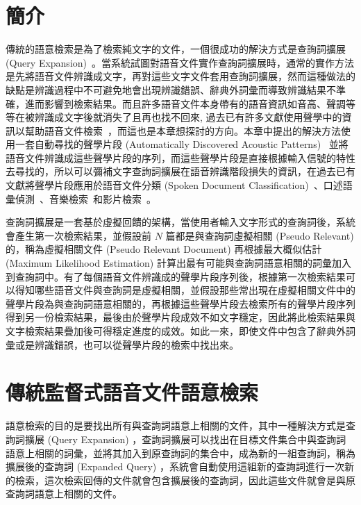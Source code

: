 \section{簡介}
傳統的語意檢索是為了檢索純文字的文件，一個很成功的解決方式是查詢詞擴展 (Query Expansion)~\cite{tao2006regularized, lavrenko2001relevance, lv2009comparative}。當系統試圖對語音文件實作查詢詞擴展時，通常的實作方法是先將語音文件辨識成文字，再對這些文字文件套用查詢詞擴展，然而這種做法的缺點是辨識過程中不可避免地會出現辨識錯誤、辭典外詞彙而導致辨識結果不準確，進而影響到檢索結果。而且許多語音文件本身帶有的語音資訊如音高、聲調等等在被辨識成文字後就消失了且再也找不回來, 過去已有許多文獻使用聲學中的資訊以幫助語音文件檢索~\cite{parada2009query, norouzian2012exploiting, lee2012open, lee2011improved, lee2012integrating}，而這也是本章想探討的方向。本章中提出的解決方法使用一套自動尋找的聲學片段 (Automatically Discovered Acoustic Patterns)~\cite{lee2012nonparametric, jansen2011towards, jansen2010towards, park2008unsupervised, stouten2008discovering, wang2011iterative, vanhainen2012word, driesen2012fast, zhang2010towards} 並將語音文件辨識成這些聲學片段的序列，而這些聲學片段是直接根據輸入信號的特性去尋找的，所以可以彌補文字查詢詞擴展在語音辨識階段損失的資訊，在過去已有文獻將聲學片段應用於語音文件分類 (Spoken Document Classification)~\cite{siu2010improved, hazen2011topic, gish2009unsupervised, chaudhuri2011unsupervised}、口述語彙偵測~\cite{lee2012nonparametric, huijbregts2011unsupervised, chan2011unsupervised, wang2012acoustic}、音樂檢索~\cite{riley2008text}和影片檢索~\cite{liu2010coherent}。

查詢詞擴展是一套基於虛擬回饋的架構，當使用者輸入文字形式的查詢詞後，系統會產生第一次檢索結果，並假設前 $N$ 篇都是與查詢詞虛擬相關 (Pseudo Relevant) 的，稱為虛擬相關文件 (Pseudo Relevant Document) 再根據最大概似估計 (Maximum Likelihood Estimation) 計算出最有可能與查詢詞語意相關的詞彙加入到查詢詞中。有了每個語音文件辨識成的聲學片段序列後，根據第一次檢索結果可以得知哪些語音文件與查詢詞是虛擬相關，並假設那些常出現在虛擬相關文件中的聲學片段為與查詢詞語意相關的，再根據這些聲學片段去檢索所有的聲學片段序列得到另一份檢索結果，最後由於聲學片段成效不如文字穩定，因此將此檢索結果與文字檢索結果疊加後可得穩定進度的成效。如此一來，即使文件中包含了辭典外詞彙或是辨識錯誤，也可以從聲學片段的檢索中找出來。

\section{傳統監督式語音文件語意檢索}
\label{sec:chap4_semantic_retrieval}
語意檢索的目的是要找出所有與查詢詞語意上相關的文件，其中一種解決方式是查詢詞擴展 (Query Expansion) ，查詢詞擴展可以找出在目標文件集合中與查詢詞語意上相關的詞彙，並將其加入到原查詢詞的集合中，成為新的一組查詢詞，稱為擴展後的查詢詞 (Expanded Query) ，系統會自動使用這組新的查詢詞進行一次新的檢索，這次檢索回傳的文件就會包含擴展後的查詢詞，因此這些文件就會是與原查詢詞語意上相關的文件。


